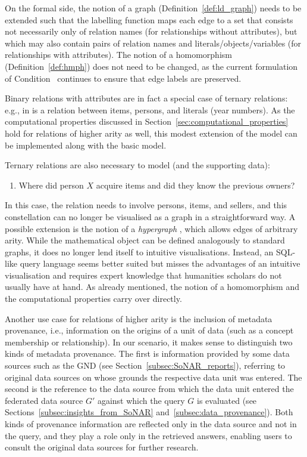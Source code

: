 On the formal side, the notion of a graph (Definition~\ref{def:ld_graph})
needs to be extended such that the labelling function \Lmc maps each edge to a set
that consists not necessarily only of relation names (for relationships without attributes),
but which may also contain pairs of relation names and literals/objects/variables (for relationships with attributes).
The notion of a homomorphism (Definition~\ref{def:hmph}) does not need to be changed,
as the current formulation of Condition~ continues to ensure that edge labels are preserved.

Binary relations with attributes are in fact a special case of ternary relations: e.g.,  in 
is a relation between items, persons, and literals (year numbers).
As the computational properties discussed in Section~\ref{sec:computational_properties}
hold for relations of higher arity as well, this modest extension of the model can be implemented
along with the basic model.

Ternary relations are also necessary to model  (and the supporting data):
%
\begin{enumerate}
  \item[\exaquery{9}]
    Where did person $X$ acquire items and did they know the previous owners?
\end{enumerate}
%
In this case, the relation  needs to involve persons, items, and sellers,
and this constellation can no longer be visualised as a graph in a straightforward way.
A possible extension is the notion of a \emph{hypergraph} \autocite[§7.1]{Voloshin2009},
which allows edges of arbitrary arity.
While the mathematical object can be defined analogously to standard graphs,
it does no longer lend itself to intuitive visualisations.
Instead, an \gls{SQL}-like query language seems better suited
but misses the advantages of an intuitive visualisation 
and requires expert knowledge that humanities scholars do not usually have at hand.
As already mentioned, the notion of a homomorphism and the computational properties
carry over directly.

Another use case for relations of higher arity is the inclusion of metadata provenance,
i.e., information on the origins of a unit of data (such as a concept membership or relationship).
In our scenario, it makes sense to distinguish two kinds of
metadata provenance. The first is information provided by some data sources such as the \gls{GND}
(see Section~\ref{subsec:SoNAR_reports}), referring to original data sources on whose grounds
the respective data unit was entered.
The second is the reference to the data source from which the data unit entered
the federated data source $G'$ against which the query $G$ is evaluated
(see Sections~\ref{subsec:insights_from_SoNAR} and~\ref{subsec:data_provenance}).
Both kinds of provenance information are reflected only in the data source
and not in the query, and they play a role only in the retrieved answers,
enabling users to consult the original data sources for further research.

